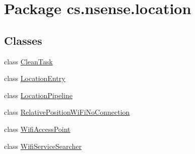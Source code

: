 \hypertarget{namespacecs_1_1nsense_1_1location}{\section{Package cs.\-nsense.\-location}
\label{namespacecs_1_1nsense_1_1location}
}
\subsection*{Classes}
\begin{DoxyCompactItemize}
\item 
class \hyperlink{classcs_1_1nsense_1_1location_1_1_clean_task}{Clean\-Task}
\item 
class \hyperlink{classcs_1_1nsense_1_1location_1_1_location_entry}{Location\-Entry}
\item 
class \hyperlink{classcs_1_1nsense_1_1location_1_1_location_pipeline}{Location\-Pipeline}
\item 
class \hyperlink{classcs_1_1nsense_1_1location_1_1_relative_position_wi_fi_no_connection}{Relative\-Position\-Wi\-Fi\-No\-Connection}
\item 
class \hyperlink{classcs_1_1nsense_1_1location_1_1_wifi_access_point}{Wifi\-Access\-Point}
\item 
class \hyperlink{classcs_1_1nsense_1_1location_1_1_wifi_service_searcher}{Wifi\-Service\-Searcher}
\end{DoxyCompactItemize}


